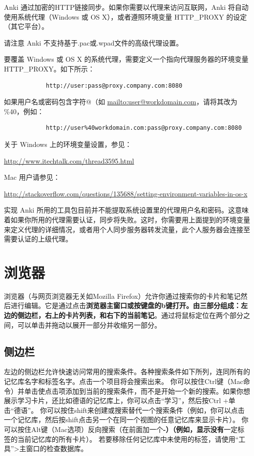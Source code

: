 \documentclass[a4paper]{book}
\begin{document}
		Anki 通过加密的HTTP链接同步。如果你需要以代理来访问互联网，Anki 将自动使用系统代理（Windows 或 OS X），或者遵照环境变量 HTTP\_PROXY 的设定（其它平台）。
		
		请注意 Anki 不支持基于.pac或.wpad文件的高级代理设置。
		
		要覆盖 Windows 或 OS X 的系统代理，需要定义一个指向代理服务器的环境变量 HTTP\_PROXY。如下所示：
		
		\begin{shaded}\begin{verbatim}
			http://user:pass@proxy.company.com:8080
			\end{verbatim}\end{shaded}
		
		如果用户名或密码包含字符@（如 \url{mailto:user@workdomain.com}，请将其改为 \%40，例如：
		
		\begin{shaded}\begin{verbatim}
			http://user%40workdomain.com:pass@proxy.company.com:8080
			\end{verbatim}\end{shaded}
		关于 Windows 上的环境变量设置，参见：
		
		\url{http://www.itechtalk.com/thread3595.html}
		
		Mac 用户请参见：
		
		\url{http://stackoverflow.com/questions/135688/setting-environment-variables-in-os-x}
		
		
		\begin{shaded}
			实现 Anki 所用的工具包目前并不能提取系统设置里的代理用户名和密码。这意味着如果你所用的代理需要认证，同步将失败。这时，你需要用上面提到的环境变量来定义代理的详细情况，或者用个人同步服务器转发流量，此个人服务器会连接至需要认证的上级代理。
		\end{shaded}
		
		
		\chapter{浏览器}\label{browser}
		
		浏览器（与网页浏览器无关如Mozilla Firefox）允许你通过搜索你的卡片和笔记然后进行编辑。它是通过点击\textbf{浏览器主窗口或按键盘的b键打开。由三部分组成：左边的侧边栏，右上的卡片列表，和右下的当前笔记}。通过将鼠标定位在两个部分之间，可以单击并拖动以展开一部分并收缩另一部分。
		\section{侧边栏}
		左边的侧边栏允许快速访问常用的搜索条件。各种搜索条件如下所列，连同所有的记忆库名字和标签名字。点击一个项目将会搜索出来。
		你可以按住Ctrl键（Mac命令）并单击使点击项添加到当前的搜索条件，而不是开始一个新的搜索。如果你想展示学习卡片，还比如德语的记忆库上，你可以点击“学习”，然后按Ctrl +单击“德语”。
		你可以按住shift来创建或搜索替代一个搜索条件（例如，你可以点击一个记忆库，然后按shift点击另一个在同一个视图的任意记忆库来显示卡片）。
		你可以按住Alt键（Mac选项）反向搜索（在前面加一个\textbf{-）（例如，显示没有}一定标签的当前记忆库的所有卡片）。
		若要移除任何记忆库中未使用的标签，请使用“工具”>主窗口的检查数据库。
\end{document}

